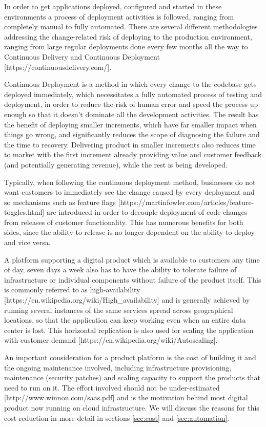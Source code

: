 \documentclass[reprint,amsmath,amssymb,aps]{revtex4-1}
\begin{document}
In order to get applications deployed, configured and started in these environments a process of deployment activities is followed, ranging from completely manual to fully automated. There are several different methodologies addressing the change-related risk of deploying to the production environment, ranging from large regular deployments done every few months all the way to Continuous Delivery and Continuous Deployment [https://continuousdelivery.com/]. 

Continuous Deployment is a method in which every change to the codebase gets deployed immediately, which necessitates a fully automated process of testing and deployment, in order to reduce the risk of human error and speed the process up enough so that it doesn’t dominate all the development activities. The result has the benefit of deploying smaller increments, which have far smaller impact when things go wrong, and significantly reduces the scope of diagnosing the failure and the time to recovery. Delivering product in smaller increments also reduces time to market with the first increment already providing value and customer feedback (and potentially generating revenue), while the rest is being developed.

Typically, when following the continuous deployment method, businesses do not want customers to immediately see the change caused by every deployment and so mechanisms such as feature flags [https://martinfowler.com/articles/feature-toggles.html] are introduced in order to decouple deployment of code changes from releases of customer functionality. This has numerous benefits for both sides, since the ability to release is no longer dependent on the ability to deploy and vice versa.

A platform supporting a digital product which is available to customers any time of day, seven days a week also has to have the ability to tolerate failure of infrastructure or individual components without failure of the product itself. This is commonly referred to as high-availability [https://en.wikipedia.org/wiki/High\_availability] and is generally achieved by running several instances of the same services spread across geographical locations, so that the application can keep working even when an entire data center is lost. This horizontal replication is also used for scaling the application with customer demand [https://en.wikipedia.org/wiki/Autoscaling].

An important consideration for a product platform is the cost of building it and the ongoing maintenance involved, including infrastructure provisioning, maintenance (security patches) and scaling capacity to support the products that need to run on it. The effort involved should not be under-estimated [http://www.winnou.com/saas.pdf] and is the motivation behind most digital product now running on cloud infrastructure. We will discuss the reasons for this cost reduction in more detail in sections \ref{sec:cost} and \ref{sec:automation}.
\end{document}

